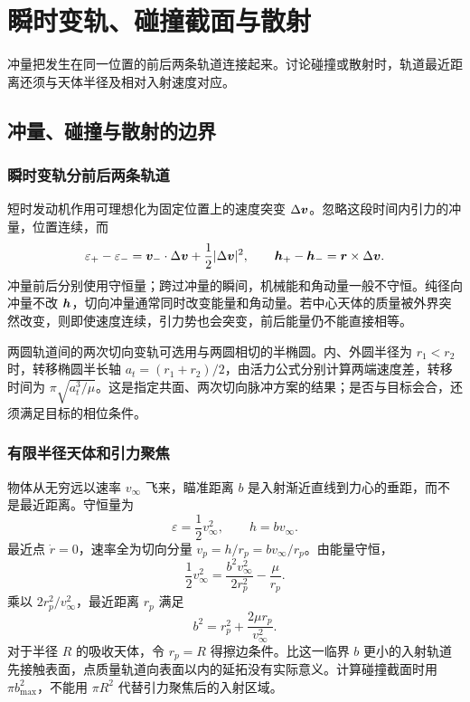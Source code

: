\section{瞬时变轨、碰撞截面与散射}

冲量把发生在同一位置的前后两条轨道连接起来。讨论碰撞或散射时，轨道最近距离还须与天体半径及相对入射速度对应。



\subsection{冲量、碰撞与散射的边界}
\subsubsection{瞬时变轨分前后两条轨道}

短时发动机作用可理想化为固定位置上的速度突变 $\Delta\bm{v}$。忽略这段时间内引力的冲量，位置连续，而
\begin{equation}\label{sup8:eq:d8-impulse}
 \varepsilon_+-\varepsilon_-=\bm{v}_-\cdot\Delta\bm{v}
       +\frac12|\Delta\bm{v}|^2,\qquad
 \bm{h}_+-\bm{h}_-=\bm{r}\times\Delta\bm{v}.
\end{equation}
冲量前后分别使用守恒量；跨过冲量的瞬间，机械能和角动量一般不守恒。纯径向冲量不改 $\bm{h}$，切向冲量通常同时改变能量和角动量。若中心天体的质量被外界突然改变，则即使速度连续，引力势也会突变，前后能量仍不能直接相等。

两圆轨道间的两次切向变轨可选用与两圆相切的半椭圆。内、外圆半径为 $r_1<r_2$ 时，转移椭圆半长轴 $a_t=(r_1+r_2)/2$，由活力公式分别计算两端速度差，转移时间为 $\pi\sqrt{a_t^3/\mu}$。这是指定共面、两次切向脉冲方案的结果；是否与目标会合，还须满足目标的相位条件。

\subsubsection{有限半径天体和引力聚焦}

物体从无穷远以速率 $v_\infty$ 飞来，瞄准距离 $b$ 是入射渐近直线到力心的垂距，而不是最近距离。守恒量为
\[
 \varepsilon=\frac12v_\infty^2,\qquad h=bv_\infty.
\]
最近点 $\dot r=0$，速率全为切向分量 $v_p=h/r_p=bv_\infty/r_p$。由能量守恒，
\[
\frac12v_\infty^2=\frac{b^2v_\infty^2}{2r_p^2}-\frac\mu{r_p}.
\]
乘以 $2r_p^2/v_\infty^2$，最近距离 $r_p$ 满足
\begin{equation}\label{sup8:eq:d8-focusing}
 b^2=r_p^2+\frac{2\mu r_p}{v_\infty^2}.
\end{equation}
对于半径 $R$ 的吸收天体，令 $r_p=R$ 得擦边条件。比这一临界 $b$ 更小的入射轨道先接触表面，点质量轨道向表面以内的延拓没有实际意义。计算碰撞截面时用 $\pi b_{\max}^2$，不能用 $\pi R^2$ 代替引力聚焦后的入射区域。


